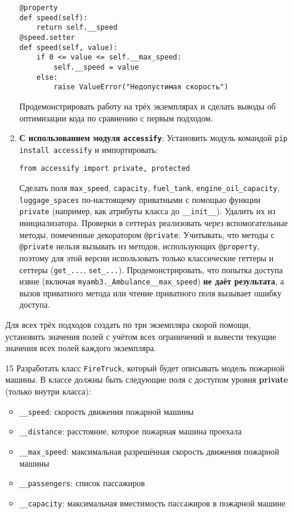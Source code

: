\begin{enumerate}
\begin{enumerate}
\begin{verbatim}
@property
def speed(self):
    return self.__speed
@speed.setter
def speed(self, value):
    if 0 <= value <= self.__max_speed:
        self.__speed = value
    else:
        raise ValueError("Недопустимая скорость")
    \end{verbatim}  
    Продемонстрировать работу на трёх экземплярах и сделать выводы об оптимизации кода по сравнению с первым подходом.
    \item \textbf{С использованием модуля \texttt{accessify}}:  
    Установить модуль командой \texttt{pip install accessify} и импортировать:  
    \begin{verbatim}
from accessify import private, protected
    \end{verbatim}  
    Сделать поля \texttt{max\_speed}, \texttt{capacity}, \texttt{fuel\_tank}, \texttt{engine\_oil\_capacity}, \texttt{luggage\_spaces} по-настоящему приватными с помощью функции \texttt{private} (например, как атрибуты класса до \texttt{\_\_init\_\_}). Удалить их из инициализатора.  
    Проверки в сеттерах реализовать через вспомогательные методы, помеченные декоратором \texttt{@private}.  
    Учитывать, что методы с \texttt{@private} нельзя вызывать из методов, использующих \texttt{@property}, поэтому для этой версии использовать только классические геттеры и сеттеры (\texttt{get\_...}, \texttt{set\_...}).  
    Продемонстрировать, что попытка доступа извне (включая \texttt{myamb3.\_Ambulance\_\_max\_speed}) \textbf{не даёт результата}, а вызов приватного метода или чтение приватного поля вызывает ошибку доступа.
\end{enumerate}
Для всех трёх подходов создать по три экземпляра скорой помощи, установить значения полей с учётом всех ограничений и вывести текущие значения всех полей каждого экземпляра.
\item[15] Разработать класс \texttt{FireTruck}, который будет описывать модель пожарной машины. В классе должны быть следующие поля с доступом уровня \textbf{private} (только внутри класса):
\begin{itemize}
    \item \texttt{\_\_speed}: скорость движения пожарной машины  
    \item \texttt{\_\_distance}: расстояние, которое пожарная машина проехала  
    \item \texttt{\_\_max\_speed}: максимальная разрешённая скорость движения пожарной машины  
    \item \texttt{\_\_passengers}: список пассажиров  
    \item \texttt{\_\_capacity}: максимальная вместимость пассажиров в пожарной машине  

\end{itemize}
\end{enumerate}
